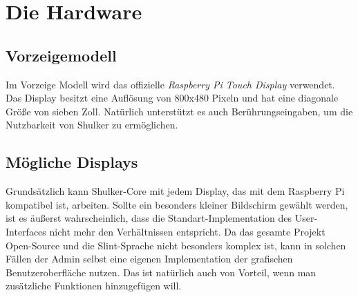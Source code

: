 \section{Die Hardware}

\subsection{Vorzeigemodell}
Im Vorzeige Modell wird das offizielle \textit{Raspberry Pi Touch Display} verwendet. Das Display besitzt eine Auflösung von
800x480 Pixeln und hat eine diagonale Größe von sieben Zoll. Natürlich unterstützt es auch Berührungseingaben, um die Nutzbarkeit
von Shulker zu ermöglichen.

\subsection{Mögliche Displays}
Grundsätzlich kann Shulker-Core mit jedem Display, das mit dem Raspberry Pi kompatibel ist, arbeiten. Sollte ein besonders kleiner
Bildschirm gewählt werden, ist es äußerst wahrscheinlich, dass die Standart-Implementation des User-Interfaces nicht mehr
den Verhältnissen entspricht. Da das gesamte Projekt Open-Source und die Slint-Sprache nicht besonders komplex ist, kann
in solchen Fällen der Admin selbst eine eigenen Implementation der grafischen Benutzeroberfläche nutzen. Das ist natürlich auch von
Vorteil, wenn man zusätzliche Funktionen hinzugefügen will.